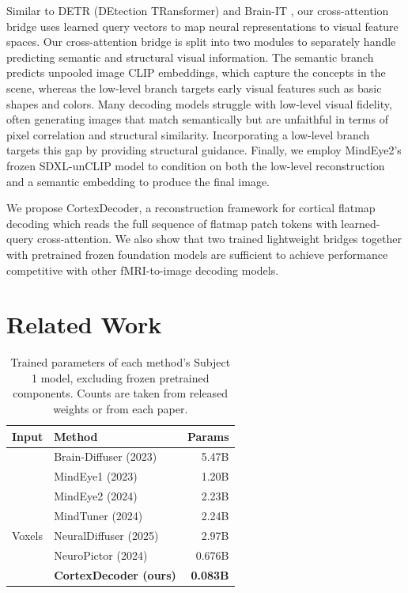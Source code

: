 \documentclass[conference]{IEEEtran}
\begin{document}
Similar to DETR (DEtection TRansformer) \cite{DBLP:journals/corr/abs-2005-12872} and Brain-IT \cite{beliy2025brainitimagereconstructionfmri}, our cross-attention bridge uses learned query vectors to map neural representations to visual feature spaces. Our cross-attention bridge is split into two modules to separately handle predicting semantic and structural visual information. The semantic branch predicts unpooled image CLIP \cite{radford2021learningtransferablevisualmodels} embeddings, which capture the concepts in the scene, whereas the low-level branch targets early visual features such as basic shapes and colors. Many decoding models struggle with low-level visual fidelity, often generating images that match semantically but are unfaithful in terms of pixel correlation and structural similarity. Incorporating a low-level branch targets this gap by providing structural guidance. Finally, we employ MindEye2's \cite{scotti2024mindeye2sharedsubjectmodelsenable} frozen SDXL-unCLIP model \cite{podell2023sdxlimprovinglatentdiffusion} to condition on both the low-level reconstruction and a semantic embedding to produce the final image.

We propose CortexDecoder, a reconstruction framework for cortical flatmap decoding which reads the full sequence of flatmap patch tokens with learned-query cross-attention. We also show that two trained lightweight bridges together with pretrained frozen foundation models are sufficient to achieve performance competitive with other fMRI-to-image decoding models.

\section{Related Work}
\label{sec:related_works}
\begin{table}[!t]
\centering
\small
\setlength{\tabcolsep}{3pt}
\begin{tabular}{@{}llr@{}}
\toprule
\textbf{Input} & \textbf{Method} & \textbf{Params} \\
\midrule
& Brain-Diffuser \cite{ozcelik2023brain} (2023) & 5.47B \\
& MindEye1 \cite{scotti2023reconstructingmindseyefmritoimage} (2023) & 1.20B \\
& MindEye2 \cite{scotti2024mindeye2sharedsubjectmodelsenable} (2024) & 2.23B \\
& MindTuner \cite{gong2024mindtunercrosssubjectvisualdecoding} (2024) & 2.24B \\
\multirow{-5}{*}{Voxels} & NeuralDiffuser \cite{Li_2025} (2025) & 2.97B \\
\midrule
& NeuroPictor \cite{huo2024neuropictorrefiningfmritoimagereconstruction} (2024) & 0.676B \\
\rowcolor{oursrow}
\cellcolor{white}\multirow{-2}{*}{Flatmap} & \textbf{CortexDecoder (ours)} & \textbf{0.083B} \\
\bottomrule
\end{tabular}
\caption{Trained parameters of each method's Subject 1 model, excluding frozen pretrained components. Counts are taken from released weights or from each paper.}
\label{tab:params}
\end{table}
\end{document}
